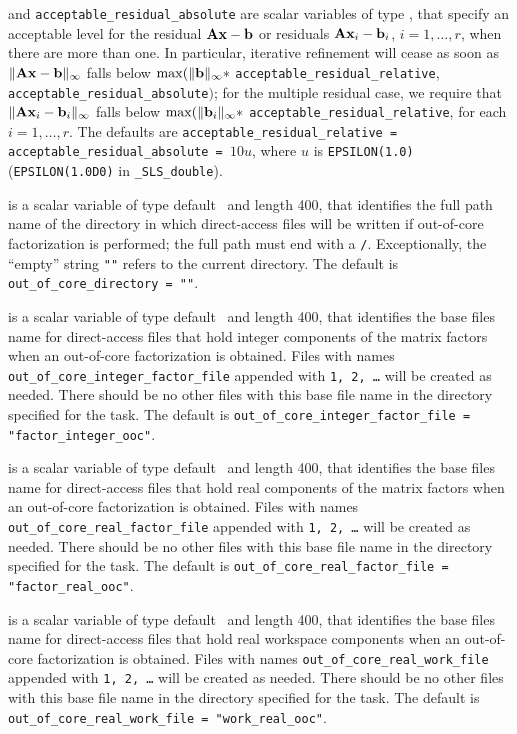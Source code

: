 \documentclass{galahad}
\newcommand{\packagename}{SLS}
\newcommand{\fullpackagename}{\libraryname\_\-\packagename}
\begin{document}
\begin{description}
  and {\tt acceptable\_residual\_absolute}
are scalar variables of type \realdp, that
specify an acceptable level for the residual ${\mathbf{A}} {\mathbf{x}} - {\mathbf{b}}$ or residuals
${\mathbf{A}} {\mathbf{x}}_i - {\mathbf{b}}_i$, $i=1,\ldots,r$,  when there are more than one.
In particular, iterative refinement will cease as soon as
$\|{\mathbf{A}} {\mathbf{x}} - {\mathbf{b}}\|_{\infty}$ falls below
$\max (\| {\mathbf{b}}\|_{\infty} \ast$ {\tt acceptable\_residual\_relative},
{\tt acceptable\_residual\_absolute}$)$;
for the multiple residual case, we require that
$\|{\mathbf{A}} {\mathbf{x}}_i - {\mathbf{b}}_i\|_{\infty}$ falls below
$\max (\| {\mathbf{b}}_i\|_{\infty} \ast$ {\tt acceptable\_residual\_relative},
for each $i=1,\ldots,r$.
The defaults are {\tt acceptable\_residual\_relative =
acceptable\_resi\-dual\_absolute = }$10 u$,
where $u$ is {\tt EPSILON(1.0)} ({\tt EPSILON(1.0D0)} in
{\tt \fullpackagename\_double}).

is a scalar variable of type default \character\
and length 400, that identifies the full path name of the
directory in which direct-access files will be written if out-of-core
factorization is performed; the full path must end with a {\tt /}.
Exceptionally, the ``empty'' string {\tt ""} refers to the current
directory. The default is {\tt out\_of\_core\_directory = ""}.

is a scalar variable of type default \character\
and length 400, that identifies the base files name for direct-access files that
hold integer components of the matrix factors when an
out-of-core factorization is obtained.
Files with names
{\tt out\_of\_core\_integer\_factor\_file}
appended with {\tt 1, 2, \ldots} will be created as needed.
There should be no other files with this base file name in the directory
specified for the task.
The default is
{\tt out\_of\_core\_integer\_factor\_file = "factor\_integer\_ooc"}.

\itt{out\_of\_core\_real\_factor\_file}
is a scalar variable of type default \character\
and length 400, that identifies the base files name for direct-access files that
hold real components of the matrix factors when an
out-of-core factorization is obtained.
Files with names
{\tt out\_of\_core\_real\_factor\_file}
appended with {\tt 1, 2, \ldots} will be created as needed.
There should be no other files with this base file name in the directory
specified for the task.
The default is
{\tt out\_of\_core\_real\_factor\_file =
"factor\_real\_ooc"}.

is a scalar variable of type default \character\
and length 400, that identifies the base files name for direct-access files that
hold real workspace components when an
out-of-core factorization is obtained.
Files with names
{\tt out\_of\_core\_real\_work\_file}
appended with {\tt 1, 2, \ldots} will be created as needed.
There should be no other files with this base file name in the directory
specified for the task.
The default is
{\tt out\_of\_core\_real\_work\_file = "work\_real\_ooc"}.


\end{description}
\end{document}
